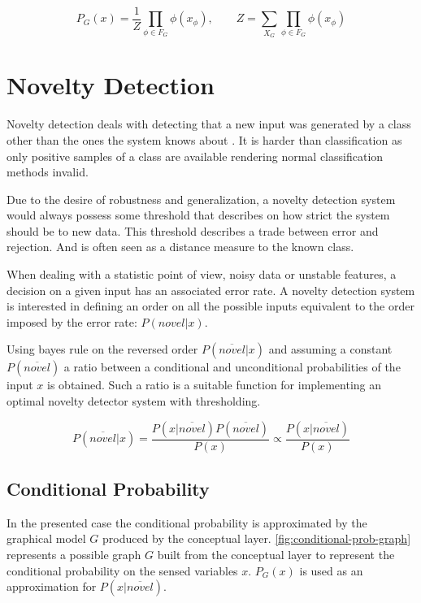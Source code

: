 \documentclass[runningheads,a4paper]{llncs}
\begin{document}
\begin{equation}
P_G(x) = \frac{1}{Z}\prod_{\phi \in F_G}{\phi(x_{\phi})},\qquad
Z = \sum_{X_G}\prod_{\phi \in F_G}{\phi(x_{\phi})}
\end{equation}


\section{Novelty Detection}
Novelty detection deals with detecting that a new input was generated by a class
other than the ones the system knows about \citep{markou2003novelty}.
It is harder than classification as only positive samples of a class are available
rendering normal classification methods invalid.

Due to the desire of robustness and generalization, a novelty detection system would
always possess some threshold that describes on how strict the system should be to
new data.
This threshold describes a trade between error and rejection.
And is often seen as a distance measure to the known class.

When dealing with a statistic point of view, noisy data or unstable features, a decision on a
given input has an associated error rate. A novelty detection system is interested in defining an
order on all the possible inputs equivalent to the order imposed by the error rate: $P(novel|x)$.

Using bayes rule on the reversed order $P(\overline{novel}|x)$ and assuming a constant $P(\overline{novel})$
a ratio between a conditional and unconditional probabilities of the input $x$ is obtained.
Such a ratio is a suitable function for implementing an optimal novelty detector system with
thresholding.

\begin{equation}
\label{eq:novelty-threshold}
          P(\overline{novel}|x)
  =       \frac{P(x|\overline{novel}) P(\overline{novel})}{P(x)}
  \propto \frac{P(x|\overline{novel})}{P(x)}
\end{equation}

\subsection{Conditional Probability}
\label{sec:conditional-prob}


In the presented case the conditional probability is approximated by the graphical model $G$
produced by the conceptual layer.
\autoref{fig:conditional-prob-graph} represents a possible graph $G$ built from the conceptual
layer to represent the conditional probability on the sensed variables $x$.
$P_G(x)$ is used as an approximation for $P(x|\overline{novel})$.
\end{document}

